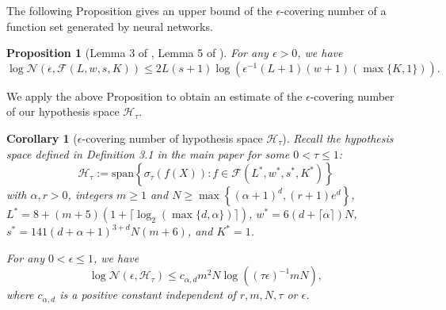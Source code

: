 \documentclass{article}
\newtheorem{proposition}{Proposition}
\newtheorem{corollary}{Corollary}
\begin{document}
The following Proposition gives an upper bound of the $\epsilon$-covering number of a function set generated by neural networks.
\begin{proposition}[Lemma 3 of \citep{suzuki2018adaptivity}, Lemma 5 of \citep{schmidt2020nonparametric}]\label{generalcovering}
    For any $\epsilon>0$, we have   \begin{equation}\label{logN}
        \log \mathcal{N}(\epsilon,\mathcal{F}(L, w, s, K)) \leq 2L (s+1)\log (\epsilon^{-1}(L+1)(w+1)(\max\{K,1\})).
    \end{equation}
\end{proposition}
We apply the above Proposition to obtain an estimate of the $\epsilon$-covering number of our hypothesis space $\mathcal{H}_\tau$. 
\begin{corollary}[$\epsilon$-covering number of hypothesis space $\mathcal{H}_\tau$]\label{covering}
    Recall the hypothesis space defined in Definition 3.1 in the main paper for some $0<\tau\leq 1$:
    $$\mathcal{H}_\tau:= \text{span}\left\{\sigma_\tau(f(X)): f\in \mathcal{F}(L^*, w^*, s^*, K^*) \right\}$$ with $\alpha,r >0$, integers $m \geq 1$ and $N \geq \max \left\{(\alpha +1)^d, (r+1)e^d\right\}$, $L^*= 8+ (m+5)(1+\lceil \log_2(\max\{d,\alpha\}) \rceil)$, $w^* = 6(d+ \lceil \alpha \rceil )N$,
   $s^*= 141 (d+\alpha +1)^{3+d}N (m+6)$, and $K^*= 1$. 
   
    For any $0 < \epsilon \leq 1$, we have 
    \begin{equation}\label{coveringeqn}
        \log \mathcal{N}(\epsilon,\mathcal{H}_\tau) \leq c_{\alpha, d} m^2  N \log ((\tau\epsilon)^{-1}mN),
    \end{equation}
    where $c_{\alpha, d}$ is a positive constant independent of $r, m , N, \tau$ or $\epsilon$. 
\end{corollary}
\end{document}
